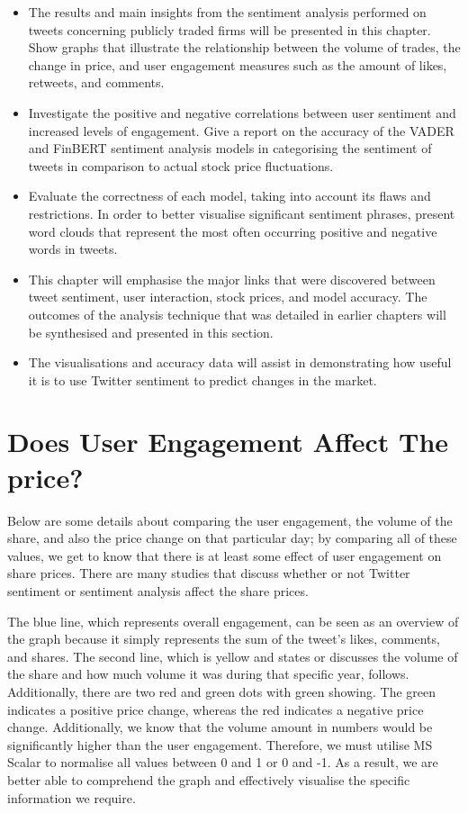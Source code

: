 \documentclass[12pt, a4paper,twoside]{report}
\theoremstyle{plain} %
\theoremstyle{definition} %
\theoremstyle{remark} %
\numberwithin{equation}{chapter}
\begin{document}
\begin{itemize}
    \item The results and main insights from the sentiment analysis performed on tweets concerning publicly traded firms will be presented in this chapter. Show graphs that illustrate the relationship between the volume of trades, the change in price, and user engagement measures such as the amount of likes, retweets, and comments.
    \item Investigate the positive and negative correlations between user sentiment and increased levels of engagement. Give a report on the accuracy of the VADER and FinBERT sentiment analysis models in categorising the sentiment of tweets in comparison to actual stock price fluctuations.
    \item Evaluate the correctness of each model, taking into account its flaws and restrictions. In order to better visualise significant sentiment phrases, present word clouds that represent the most often occurring positive and negative words in tweets.
    \item This chapter will emphasise the major links that were discovered between tweet sentiment, user interaction, stock prices, and model accuracy. The outcomes of the analysis technique that was detailed in earlier chapters will be synthesised and presented in this section.
    \item The visualisations and accuracy data will assist in demonstrating how useful it is to use Twitter sentiment to predict changes in the market.
\end{itemize}
  
    \section{Does User Engagement Affect The price?}
    Below are some details about comparing the user engagement, the volume of the share, and also the price change on that particular day; by comparing all of these values, we get to know that there is at least some effect of user engagement on share prices. There are many studies that discuss whether or not Twitter sentiment or sentiment analysis affect the share prices.
    
   The blue line, which represents overall engagement, can be seen as an overview of the graph because it simply represents the sum of the tweet's likes, comments, and shares. The second line, which is yellow and states or discusses the volume of the share and how much volume it was during that specific year, follows. Additionally, there are two red and green dots with green showing. The green indicates a positive price change, whereas the red indicates a negative price change. Additionally, we know that the volume amount in numbers would be significantly higher than the user engagement. Therefore, we must utilise MS Scalar to normalise all values between 0 and 1 or 0 and -1. As a result, we are better able to comprehend the graph and effectively visualise the specific information we require.
   
\end{document}
